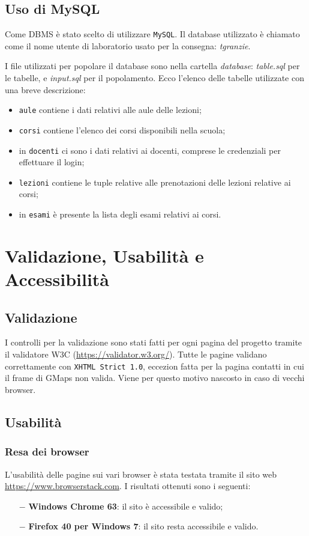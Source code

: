\documentclass[12pt, a4paper]{article}
\begin{document}
\subsection{Uso di MySQL}
Come DBMS è stato scelto di utilizzare \texttt{MySQL}. Il database utilizzato è chiamato 
come il nome utente di laboratorio usato per la consegna: \textit{tgranzie}.\par 
I file utilizzati per popolare il database sono nella cartella \mbox{\textit{database}}: \mbox{\textit{table.sql}} per le tabelle, e \mbox{\textit{input.sql}} per il popolamento. 
Ecco l'elenco delle tabelle utilizzate con una breve descrizione:

\begin{itemize}
	\item \texttt{aule} contiene i dati relativi alle aule delle lezioni;
	\item \texttt{corsi} contiene l'elenco dei corsi disponibili nella scuola;
	\item in \texttt{docenti} ci sono i dati relativi ai docenti, comprese le 
	credenziali per effettuare il login;
	\item \texttt{lezioni} contiene le tuple relative alle prenotazioni delle 
	lezioni relative ai corsi;
	\item in \texttt{esami} è presente la lista degli esami relativi ai corsi.
\end{itemize}

\section{Validazione, Usabilità e Accessibilità}

\subsection{Validazione}
I controlli per la validazione sono stati fatti per ogni pagina del progetto tramite il
validatore W3C (\mbox{\url{https://validator.w3.org/}}). Tutte le pagine validano correttamente con \texttt{\mbox{XHTML Strict 1.0}}, eccezion fatta per la pagina contatti in cui il frame
di GMaps non valida. Viene per questo motivo nascosto in caso di vecchi browser.\par

\subsection{Usabilità}

\subsubsection{Resa dei browser}
L'usabilità delle pagine sui vari browser è stata testata tramite il sito web \mbox{\url{https://www.browserstack.com}}. I risultati ottenuti sono i seguenti:
\begin{itemize}
	\item[$-$] \textbf{Windows Chrome 63}: il sito è accessibile e valido;
	\item[$-$] \textbf{Firefox 40 per Windows 7}: il sito resta accessibile e valido.
\end{itemize}
\end{document}
